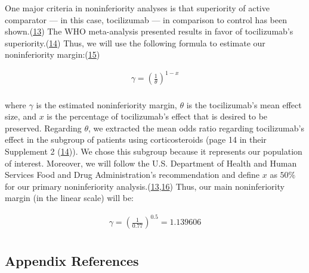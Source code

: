 \documentclass[
  12pt,
]{article}
\begin{document}
One major criteria in noninferiority analyses is that superiority of
active comparator --- in this case, tocilizumab --- in comparison to
control has been shown.(\protect\hyperlink{ref-tsui2019}{13}) The WHO
meta-analysis presented results in favor of tocilizumab's
superiority.(\protect\hyperlink{ref-whoma}{14}) Thus, we will use the
following formula to estimate our noninferiority
margin:(\protect\hyperlink{ref-trone2020}{15})

\begin{align*}
\gamma =  \left( \frac{1}{\theta} \right)^{1 - x} \\
\end{align*}

where \(\gamma\) is the estimated noninferiority margin, \(\theta\) is
the tocilizumab's mean effect size, and \(x\) is the percentage of
tocilizumab's effect that is desired to be preserved. Regarding
\(\theta\), we extracted the mean odds ratio regarding tocilizumab's
effect in the subgroup of patients using corticosteroids (page 14 in
their Supplement 2 (\protect\hyperlink{ref-whoma}{14})). We chose this
subgroup because it represents our population of interest. Moreover, we
will follow the U.S. Department of Health and Human Services Food and
Drug Administration's recommendation and define \(x\) as \(50\%\) for
our primary noninferiority
analysis.(\protect\hyperlink{ref-tsui2019}{13},\protect\hyperlink{ref-fda}{16})
Thus, our main noninferiority margin (in the linear scale) will be:

\begin{align*}
\gamma =  \left( \frac{1}{0.77} \right)^{0.5} = 1.139606 \\
\end{align*}

\newpage

\hypertarget{appendix-references}{%
\subsection{Appendix References}\label{appendix-references}}
\end{document}
